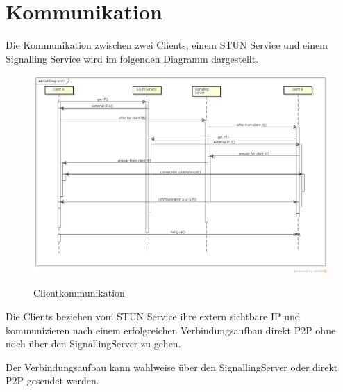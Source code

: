 \clearpage
\section{Kommunikation}
	Die Kommunikation zwischen zwei Clients, einem STUN Service und einem Signalling Service wird im folgenden Diagramm dargestellt.
	\begin{figure}[H]
		\centering
		\includegraphics[width=\textwidth]{../architekturanalayse/img/callDiagramm.png}
		\label{img:deployment}
		\caption{Clientkommunikation}
	\end{figure}
	Die Clients beziehen vom STUN Service ihre extern sichtbare IP und kommunizieren nach einem erfolgreichen Verbindungsaufbau direkt P2P ohne noch über den SignallingServer zu gehen.
	
	Der Verbindungsaufbau kann wahlweise über den SignallingServer oder direkt P2P gesendet werden.
	
